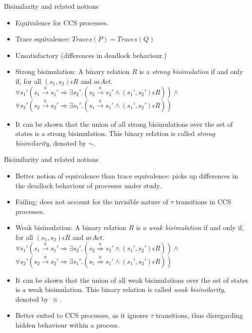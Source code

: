 \documentclass{beamer}
\begin{document}
\begin{frame}{Bisimilarity and related notions}
  \begin{itemize}
  \item Equivalence for CCS
    processes.
  \item Trace equivalence: $Traces(P) = Traces(Q)$
  \item Unsatisfactory (differences in deadlock
    behaviour.)
  \item Strong bisimulation: A binary relation $R$ is a \textit{strong
    bisimulation} if and only if, for all $(s_1, s_2) \epsilon R$ and $a \epsilon Act .$\\
    $\forall s_1' (s_1 \xrightarrow{a} s_1' \Rightarrow \exists s_2'
    . (s_2 \xrightarrow{a} s_2' \wedge (s_1', s_2') \epsilon R ) )
    \wedge $ \\
    $\forall s_2' (s_2 \xrightarrow{a} s_2' \Rightarrow \exists s_1'
    . (s_1 \xrightarrow{a} s_1' \wedge (s_1', s_2') \epsilon R ) )$
  \item It can be shown that the union of all strong bisimulations
    over the set of states is a strong bisimulation. This binary
    relation is called \textit{strong bisimilarity}, denoted by $\sim$.
  \end{itemize}
\end{frame}

\begin{frame}{Bisimilarity and related notions}
  \begin{itemize}
  \item Better notion of equivalence than trace
    equivalence: picks up differences in the deadlock
    behaviour of processes under study.
  \item Failing: does not account for the
    invisible nature of $\tau$ transitions in CCS processes.
  \item Weak bisimulation: A binary relation $R$ is a \textit{weak
    bisimulation} if and only if, for all $(s_1, s_2) \epsilon R$ and $a \epsilon Act .$\\
    $\forall s_1' (s_1 \xrightarrow{a} s_1' \Rightarrow \exists s_2'
    . (s_2 \overset{a}{\Rightarrow} s_2' \wedge (s_1', s_2') \epsilon R ) )
    \wedge $ \\
    $\forall s_2' (s_2 \xrightarrow{a} s_2' \Rightarrow \exists s_1'
    . (s_1 \overset{a}{\Rightarrow} s_1' \wedge (s_1', s_2') \epsilon R ) )$
  \item It can be shown that the union of all weak bisimulations
    over the set of states is a weak bisimulation. This binary
    relation is called \textit{weak bisimilarity}, denoted by $\approx$.
  \item Better suited to CCS processes,
    as it ignores $\tau$ transitions, thus disregarding hidden
    behaviour within a process.
  \end{itemize}
\end{frame}
\end{document}
